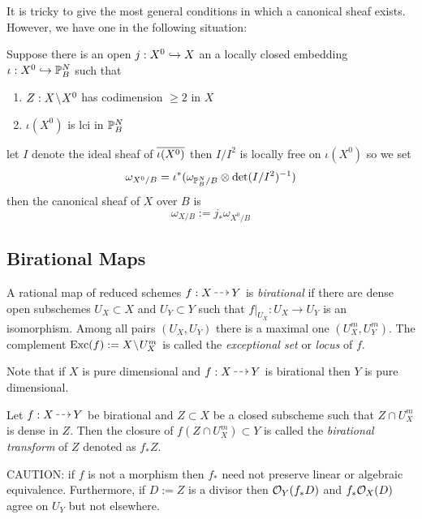 \documentclass[12pt]{article}
\begin{document}
It is tricky to give the most general conditions in which a canonical sheaf exists. However, we have one in the following situation:

\begin{prop}
Suppose there is an open $j : X^0 \embed X$ an a locally closed embedding $\iota : X^0 \embed \P^N_B$ such that
\begin{enumerate}
\item $Z : X \sm X^0$ has codimension $\ge 2$ in $X$
\item $\iota(X^0)$ is lci in $\P^N_B$
\end{enumerate}
let $I$ denote the ideal sheaf of $\ol{\iota(X^0)}$ then $I / I^2$ is locally free on $\iota(X^0)$ so we set
\[ \omega_{X^0/B} = \iota^* (\omega_{\P^N_B/B} \ot \det(I/I^2)^{-1}) \]
then the canonical sheaf of $X$ over $B$ is
\[ \omega_{X/B} := j_* \omega_{X^0 / B} \]
\end{prop}

\renewcommand{\Diff}{\mathrm{Diff}}

\subsection{Birational Maps}

\begin{defn}
A rational map of reduced schemes $f : X \rat Y$ is \textit{birational} if there are dense open subschemes $U_X \subset X$ and $U_Y \subset Y$ such that $f|_{U_X} : U_X \to U_Y$ is an isomorphism. Among all pairs $(U_X, U_Y)$ there is a maximal one $(U_X^m, U_Y^m)$. The complement $\Exc(f) := X \sm U^m_X$ is called the \textit{exceptional set} or \textit{locus} of $f$. 
\end{defn}

\begin{rmk}
Note that if $X$ is pure dimensional and $f : X \rat Y$ is birational then $Y$ is pure dimensional.
\end{rmk}

\begin{defn}
Let $f : X \rat Y$ be birational and $Z \subset X$ be a closed subscheme such that $Z \cap U^m_X$ is dense in $Z$. Then the closure of $f(Z \cap U_X^m) \subset Y$ is called the \textit{birational transform} of $Z$ denoted as $f_* Z$.  
\end{defn}

\begin{rmk}
CAUTION: if $f$ is not a morphism then $f_*$ need not preserve linear or algebraic equivalence. Furthermore, if $D := Z$ is a divisor then $\struct{Y}(f_* D)$ and $f_* \struct{X}(D)$ agree on $U_Y$ but not elsewhere. 
\end{rmk}
\end{document}
